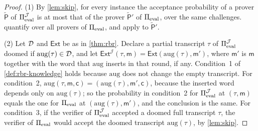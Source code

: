 \begin{proof}
(1) By \cref{lem:skip}, for every instance the acceptance probability of a prover $\tilde{\mathsf{P}}$ of $\Pi_{\mathrm{eval}}^{\mathcal{J}}$ is at most that of the prover $\tilde{\mathsf{P}}'$ of $\Pi_{\mathrm{eval}}$, over the same challenges.  quantify over all provers of $\Pi_{\mathrm{eval}}$, and apply to $\tilde{\mathsf{P}}'$.

(2) Let $\mathcal{D}$ and $\mathsf{Ext}$ be as in \cref{thm:rbr}. Declare a partial transcript $\tau$ of $\Pi_{\mathrm{eval}}^{\mathcal{J}}$ doomed if $\mathrm{aug}(\tau) \in \mathcal{D}$, and let $\mathsf{Ext}^{\mathcal{J}}(\tau, \mathsf{m}) = \mathsf{Ext}(\mathrm{aug}(\tau), \mathsf{m}')$, where $\mathsf{m}'$ is $\mathsf{m}$ together with the word that $\mathrm{aug}$ inserts in that round, if any.
Condition~1 of \cref{def:rbr-knowledge} holds because $\mathrm{aug}$ does not change the empty transcript.
For condition~2, $\mathrm{aug}(\tau, \mathsf{m}, \mathsf{c}) = (\mathrm{aug}(\tau), \mathsf{m}', \mathsf{c})$, because the inserted word depends only on $\mathrm{aug}(\tau)$; so the probability in condition~2 for $\Pi_{\mathrm{eval}}^{\mathcal{J}}$ at $(\tau, \mathsf{m})$ equals the one for $\Pi_{\mathrm{eval}}$ at $(\mathrm{aug}(\tau), \mathsf{m}')$, and the conclusion is the same.
For condition~3, if the verifier of $\Pi_{\mathrm{eval}}^{\mathcal{J}}$ accepted a doomed full transcript $\tau$, the verifier of $\Pi_{\mathrm{eval}}$ would accept the doomed transcript $\mathrm{aug}(\tau)$, by \cref{lem:skip}.


\end{proof}
